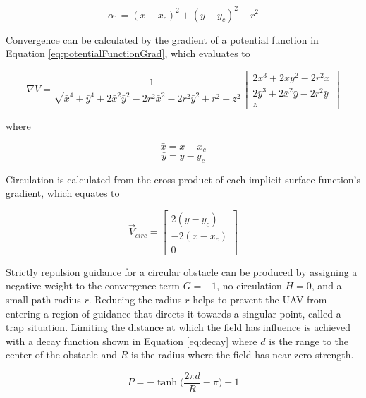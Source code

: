 \documentclass[conf]{new-aiaa}
\begin{document}
\begin{equation}\label{eq:alphaCylinder}
\alpha_1 = (x-x_c)^2 + (y-y_c)^2-r^2
\end{equation}


Convergence can be calculated by the gradient of a potential function in Equation \ref{eq:potentialFunctionGrad}, which evaluates to

\begin{equation}
\nabla V = \dfrac{-1}{\sqrt{\bar{x}^4+\bar{y}^4+2\bar{x}^2\bar{y}^2-2r^2\bar{x}^2-2r^2\bar{y}^2+r^2+z^2}}\begin{bmatrix} 2\bar{x}^3+2\bar{x}\bar{y}^2-2r^2\bar{x} \\ 2\bar{y}^3+2\bar{x}^2\bar{y}-2r^2\bar{y} \\z \end{bmatrix}
\end{equation}

where


\begin{equation}
\bar{x} = x - x_c
\end{equation}
\begin{equation}
\bar{y} = y - y_c
\end{equation}

Circulation is calculated from the cross product of each implicit surface function's gradient, which equates to

\begin{equation}\label{eq:vcirc_circle}
\overrightarrow{V}_{circ} =  \begin{bmatrix}  2(y-y_c) \\[6pt] -2(x-x_c) \\[6pt] 0\end{bmatrix}
\end{equation}



Strictly repulsion guidance for a circular obstacle can be produced by assigning a negative weight to the convergence term $G=-1$, no circulation $H=0$, and a small path radius $r$. Reducing the radius $r$ helps to prevent the UAV  from entering a region of guidance that directs it towards a singular point, called a trap situation. Limiting the distance at which the field has influence is achieved with a decay function shown in Equation \ref{eq:decay} where $d$ is the range to the center of the obstacle and $R$ is the radius where the field has near zero strength. 

\begin{equation}
\label{eq:decay}
P = -\tanh \bigg( \frac{2\pi d}{R}-\pi\bigg)+1
\end{equation}
\end{document}
